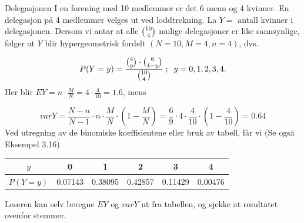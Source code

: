\begin{eksempel}{Delegasjonen}
I en forening med 10 medlemmer er det 6 menn og 4 kvinner. En
delegasjon på 4 medlemmer velges ut ved loddtrekning. La $Y=$
antall kvinner i delegasjonen. Dersom vi antar at alle
${{10}\choose{4}}$ mulige delegasjoner er like sannsynlige, følger at
$Y$ blir hypergeometrisk fordelt $(N=10, M=4, n=4)$, dvs.

\[ P(Y=y)= \frac{{{4}\choose{y}} \cdot {{6}\choose{4-y}}}{{{10}\choose{4}}}\; ; 
                          \;\; y=0,1,2,3,4. \]
\noindent Her blir  $EY=n \cdot \frac{M}{N}=4 \cdot \frac{4}{10}=1.6$, mens

\[ varY=\frac{N-n}{N-1} \cdot n \cdot \frac{M}{N} \cdot(1-\frac{M}{N})
        =\frac{6}{9} \cdot 4 \cdot \frac{4}{10} \cdot (1-\frac{4}{10})=0.64 \]
\noindent Ved utregning av de binomiske koeffisientene eller bruk av
tabell, får vi (Se også Eksempel 3.16)

\begin{center}
\begin{tabular}{c|ccccc}
   $y$   &   0   &    1   &    2   &    3   &    4      \\ \hline
$P(Y=y)$& 0.07143 & 0.38095 & 0.42857 & 0.11429 & 0.00476
\end{tabular}
\end{center}

\noindent Leseren kan selv beregne $EY$ og $varY$ ut fra tabellen, og
sjekke at resultatet ovenfor stemmer.
\end{eksempel}

